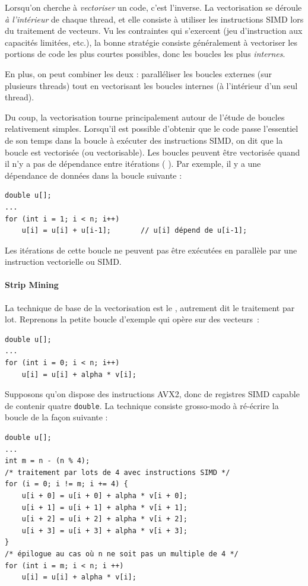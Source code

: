 \medskip

Lorsqu'on cherche à \emph{vectoriser} un code, c'est l'inverse. La vectorisation
se déroule \emph{à l'intérieur} de chaque thread, et elle consiste à utiliser
les instructions SIMD lors du traitement de \og vecteurs\fg. Vu les contraintes
qui s'exercent (jeu d'instruction aux capacités limitées, etc.), la bonne
stratégie consiste généralement à vectoriser les portions de code les plus
courtes possibles, donc les boucles les plus \emph{internes}.

En plus, on peut combiner les deux : paralléliser les boucles externes (sur
plusieurs threads) tout en vectorisant les boucles internes (à l'intérieur d'un
seul thread).

Du coup, la vectorisation tourne principalement autour de l'étude de boucles
relativement simples. Lorsqu'il est possible d'obtenir que le code passe
l'essentiel de son temps dans la boucle à exécuter des instructions SIMD, on dit
que la boucle est vectorisée (ou vectorisable). Les boucles peuvent être
vectorisée quand il n'y a pas de dépendance entre itérations (\og
{}). Par exemple, il y a une dépendance de
données dans la boucle suivante :
\begin{verbatim}
double u[];
...
for (int i = 1; i < n; i++)
    u[i] = u[i] + u[i-1];       // u[i] dépend de u[i-1];
\end{verbatim}
Les itérations de cette boucle ne peuvent pas être exécutées \og en parallèle\fg
par une instruction vectorielle ou SIMD.


\paragraph{Strip Mining}

La technique de base de la vectorisation est le \og {}\fg,
autrement dit le traitement par lot. Reprenons la petite boucle d'exemple qui
opère sur des vecteurs~:
\begin{verbatim}
double u[];
...
for (int i = 0; i < n; i++)
    u[i] = u[i] + alpha * v[i];
\end{verbatim}

Supposons qu'on dispose des instructions AVX2, donc de registres SIMD capable de
contenir quatre \texttt{double}. La technique consiste grosso-modo à ré-écrire
la boucle de la façon suivante :
\begin{verbatim}
double u[];
...
int m = n - (n % 4);
/* traitement par lots de 4 avec instructions SIMD */
for (i = 0; i != m; i += 4) {
    u[i + 0] = u[i + 0] + alpha * v[i + 0];
    u[i + 1] = u[i + 1] + alpha * v[i + 1];
    u[i + 2] = u[i + 2] + alpha * v[i + 2];
    u[i + 3] = u[i + 3] + alpha * v[i + 3];
}
/* épilogue au cas où n ne soit pas un multiple de 4 */
for (int i = m; i < n; i ++)
    u[i] = u[i] + alpha * v[i];
\end{verbatim}

